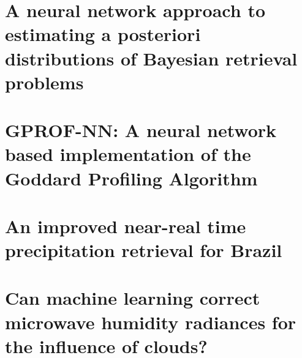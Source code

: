 \documentclass[12pt, a4paper, twoside]{report}
\begin{document}
\chapter{A neural network approach to estimating a posteriori distributions of Bayesian retrieval problems} 
\label{chap:qrnn}
\thispagestyle{empty}
\cleardoublepage            %


\chapter{GPROF-NN: A neural network based implementation of the Goddard Profiling Algorithm} 
\label{chap:qrnn}
\thispagestyle{empty}       %
\cleardoublepage            %


\chapter{An improved near-real time precipitation retrieval for Brazil} 
\thispagestyle{empty}       %
\cleardoublepage            %


\chapter{Can machine learning correct microwave humidity radiances for the influence of clouds?} 
\thispagestyle{empty}       %
\cleardoublepage            %

\end{document}
